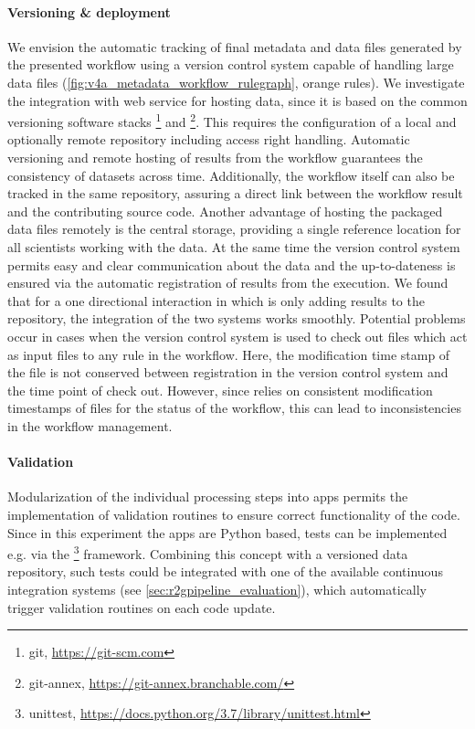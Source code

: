 \paragraph{Versioning \& deployment}
We envision the automatic tracking of final metadata and data files generated by the presented workflow using a version control system capable of handling large data files (\cref{fig:v4a_metadata_workflow_rulegraph}, orange rules). We investigate the integration with  web service for hosting data, since it is based on the common versioning software stacks \footnote{git, \url{https://git-scm.com}} and \footnote{git-annex, \url{https://git-annex.branchable.com/}}. This requires the configuration of a local and optionally remote repository including access right handling. Automatic versioning and remote hosting of results from the  workflow guarantees the consistency of datasets across time. Additionally, the  workflow itself can also be tracked in the same repository, assuring a direct link between the workflow result and the contributing source code.
Another advantage of hosting the packaged data files remotely is the central storage, providing a single reference location for all scientists working with the data. At the same time the version control system permits easy and clear communication about the data and the up-to-dateness is ensured via the automatic registration of results from the  execution.
We found that for a one directional interaction in which  is only adding results to the repository, the integration of the two systems works smoothly. Potential problems occur in cases when the version control system is used to check out files which act as input files to any rule in the workflow. Here, the modification time stamp of the file is not conserved between registration in the version control system and the time point of check out. However, since  relies on consistent modification timestamps of files for the status of the workflow, this can lead to inconsistencies in the workflow management.

\paragraph{Validation}
Modularization of the individual processing steps into apps permits the implementation of validation routines to ensure correct functionality of the code. Since in this experiment the apps are Python based, tests can be implemented e.g. via the \footnote{unittest, \url{https://docs.python.org/3.7/library/unittest.html}} framework. Combining this concept with a versioned data repository, such tests could be integrated with one of the available continuous integration systems (see \cref{sec:r2gpipeline_evaluation}), which automatically trigger validation routines on each code update.

